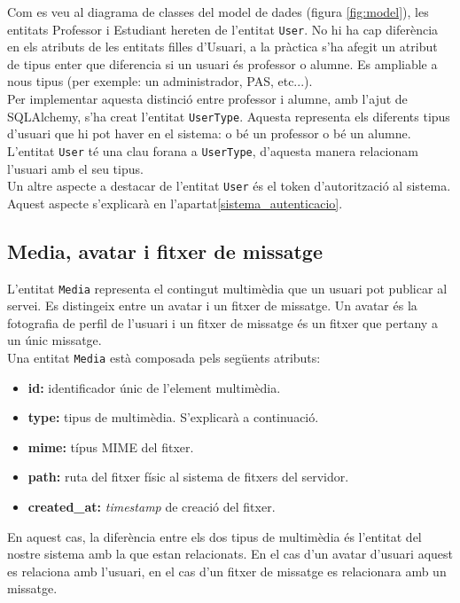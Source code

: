 	Com es veu al diagrama de classes del model de dades (figura \ref{fig:model}), les entitats Professor i Estudiant hereten de l'entitat \texttt{User}. No hi ha cap diferència en els atributs de les entitats filles d'Usuari, a la pràctica s'ha afegit un atribut de tipus enter que diferencia si un usuari és professor o alumne. Es ampliable a nous tipus (per exemple: un administrador, \ac{PAS}, etc...). \\
	
	Per implementar aquesta distinció entre professor i alumne, amb l'ajut de SQLAlchemy, s'ha creat l'entitat \texttt{UserType}. Aquesta representa els diferents tipus d'usuari que hi pot haver en el sistema: o bé un professor o bé un alumne. L'entitat \texttt{User} té una clau forana a \texttt{UserType}, d'aquesta manera relacionam l'usuari amb el seu tipus. \\
	
	Un altre aspecte a destacar de l'entitat \texttt{User} és el token d'autorització al sistema. Aquest aspecte s'explicarà en l'apartat\ref{sistema_autenticacio}.


	\subsection{Media, avatar i fitxer de missatge} \label{media_avatar_fitxer}
	
	L'entitat \texttt{Media} representa el contingut multimèdia que un usuari pot publicar al servei. Es distingeix entre un avatar i un fitxer de missatge. Un avatar és la fotografia de perfil de l'usuari i un fitxer de missatge és un fitxer que pertany a un únic missatge. \\
	
	Una entitat \texttt{Media} està composada pels següents atributs:
	
	\begin{itemize}
		\item \textbf{id:} identificador únic de l'element multimèdia.
		\item \textbf{type:} tipus de multimèdia. S'explicarà a continuació.
		\item \textbf{mime:} típus \ac{MIME} del fitxer.
		\item \textbf{path:} ruta del fitxer físic al sistema de fitxers del servidor.
		\item \textbf{created\_at:} \emph{timestamp} de creació del fitxer.
	\end{itemize}
	
	En aquest cas, la diferència entre els dos tipus de multimèdia és l'entitat del nostre sistema amb la que estan relacionats. En el cas d'un avatar d'usuari aquest es relaciona amb l'usuari, en el cas d'un fitxer de missatge es relacionara amb un missatge.\\

